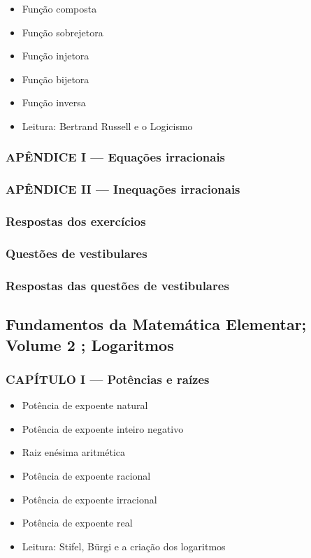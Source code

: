 \documentclass[a4paper,12pt]{article}[abntex2]
\begin{document}
\begin{itemize}
\item Função composta
\item Função sobrejetora
\item Função injetora
\item Função bijetora
\item Função inversa
\item Leitura: Bertrand Russell e o Logicismo
\end{itemize}
\subsubsection*{APÊNDICE I — Equações irracionais}

\subsubsection*{APÊNDICE II — Inequações irracionais}

\subsubsection*{Respostas dos exercícios}

\subsubsection*{Questões de vestibulares}

\subsubsection*{Respostas das questões de vestibulares}
 
 \subsection{Fundamentos da Matemática Elementar; Volume 2 ; Logaritmos}

\subsubsection*{CAPÍTULO I — Potências e raízes}

\begin{itemize}
\item Potência de expoente natural
\item Potência de expoente inteiro negativo
\item Raiz enésima aritmética
\item Potência de expoente racional
\item Potência de expoente irracional
\item Potência de expoente real
\item Leitura: Stifel, Bürgi e a criação dos logaritmos
\end{itemize}
\end{document}
